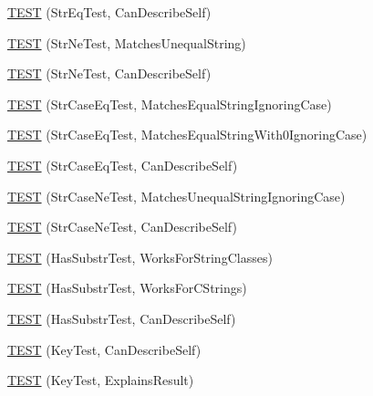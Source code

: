 \begin{DoxyCompactItemize}
\item 
\mbox{\hyperlink{namespacetesting_1_1gmock__matchers__test_a1cb9d74bdf937816807e91b842b22c75}{T\+E\+ST}} (Str\+Eq\+Test, Can\+Describe\+Self)
\item 
\mbox{\hyperlink{namespacetesting_1_1gmock__matchers__test_a3c0a0ca54e3d34c55bd30c2b5572d902}{T\+E\+ST}} (Str\+Ne\+Test, Matches\+Unequal\+String)
\item 
\mbox{\hyperlink{namespacetesting_1_1gmock__matchers__test_a4daef0c28c6b07cb3d6a6306c05599b0}{T\+E\+ST}} (Str\+Ne\+Test, Can\+Describe\+Self)
\item 
\mbox{\hyperlink{namespacetesting_1_1gmock__matchers__test_ae0c0b82b3895923747dc70cb9339a8dc}{T\+E\+ST}} (Str\+Case\+Eq\+Test, Matches\+Equal\+String\+Ignoring\+Case)
\item 
\mbox{\hyperlink{namespacetesting_1_1gmock__matchers__test_aa159c9a52c6dc18cb7f214fbb5bddece}{T\+E\+ST}} (Str\+Case\+Eq\+Test, Matches\+Equal\+String\+With0\+Ignoring\+Case)
\item 
\mbox{\hyperlink{namespacetesting_1_1gmock__matchers__test_ab4fb6542ea3a7789850668a9266a80ef}{T\+E\+ST}} (Str\+Case\+Eq\+Test, Can\+Describe\+Self)
\item 
\mbox{\hyperlink{namespacetesting_1_1gmock__matchers__test_a9a627f8538cfff62fbaee86ac465f6c8}{T\+E\+ST}} (Str\+Case\+Ne\+Test, Matches\+Unequal\+String\+Ignoring\+Case)
\item 
\mbox{\hyperlink{namespacetesting_1_1gmock__matchers__test_ae953891c7961b6ffd51dc712be8d24de}{T\+E\+ST}} (Str\+Case\+Ne\+Test, Can\+Describe\+Self)
\item 
\mbox{\hyperlink{namespacetesting_1_1gmock__matchers__test_a2a1043a0b8bfb4bc0b5fb539317132a3}{T\+E\+ST}} (Has\+Substr\+Test, Works\+For\+String\+Classes)
\item 
\mbox{\hyperlink{namespacetesting_1_1gmock__matchers__test_a147dde340ba8f77308cd116d3bb831d6}{T\+E\+ST}} (Has\+Substr\+Test, Works\+For\+C\+Strings)
\item 
\mbox{\hyperlink{namespacetesting_1_1gmock__matchers__test_ae47e8ad8f8a4a33ac08b596eb839380e}{T\+E\+ST}} (Has\+Substr\+Test, Can\+Describe\+Self)
\item 
\mbox{\hyperlink{namespacetesting_1_1gmock__matchers__test_acdbdca45a537261fd168cdb8df9348d7}{T\+E\+ST}} (Key\+Test, Can\+Describe\+Self)
\item 
\mbox{\hyperlink{namespacetesting_1_1gmock__matchers__test_a38169c972e14fef59a41e532fb5b431e}{T\+E\+ST}} (Key\+Test, Explains\+Result)
\item 

\end{DoxyCompactItemize}
